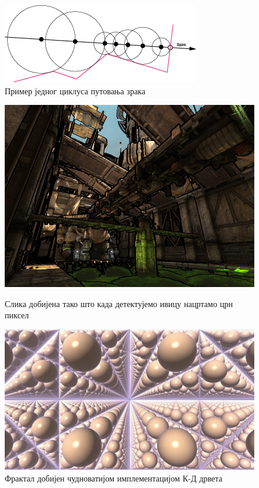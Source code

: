 \documentclass[12pt]{article}
\begin{document}
	\begin{figure}[H]
		\centering
		\includegraphics[max width=0.45\linewidth]{slike/ocrtavanjeZrakova.png}
		\caption{Пример једног циклуса путовања зрака}
		\label{fig:ocrtavanjezrakova}
	\end{figure}
	
	\begin{figure}[H]
		\begin{minipage}{0.4\linewidth}
			\centering
			\includegraphics[max width=\linewidth]{slike/primerDetekcijeIvice.jpg}
			\caption{Слика добијена тако што када детектујемо ивицу нацртамо црн пиксел}
			\label{fig:detekcijaIvice}
		\end{minipage}\hfill
		\begin{minipage}{0.5\linewidth}
			\centering
			\includegraphics[max width=\linewidth]{slike/kdDrvoFraktali.jpg}
			\caption{Фрактал добијен чудноватијом имплементацијом К-Д дрвета}
			\label{fig:fraktali}
		\end{minipage}
	\end{figure}
	
\end{document}
